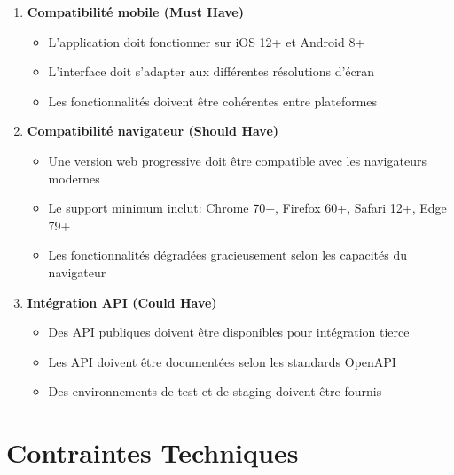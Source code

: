 \begin{enumerate}
    \item \textbf{Compatibilité mobile (Must Have)}
    \begin{itemize}
        \item L'application doit fonctionner sur iOS 12+ et Android 8+
        \item L'interface doit s'adapter aux différentes résolutions d'écran
        \item Les fonctionnalités doivent être cohérentes entre plateformes
    \end{itemize}
    
    \item \textbf{Compatibilité navigateur (Should Have)}
    \begin{itemize}
        \item Une version web progressive doit être compatible avec les navigateurs modernes
        \item Le support minimum inclut: Chrome 70+, Firefox 60+, Safari 12+, Edge 79+
        \item Les fonctionnalités dégradées gracieusement selon les capacités du navigateur
    \end{itemize}
    
    \item \textbf{Intégration API (Could Have)}
    \begin{itemize}
        \item Des API publiques doivent être disponibles pour intégration tierce
        \item Les API doivent être documentées selon les standards OpenAPI
        \item Des environnements de test et de staging doivent être fournis
    \end{itemize}
\end{enumerate}

\section{Contraintes Techniques}

